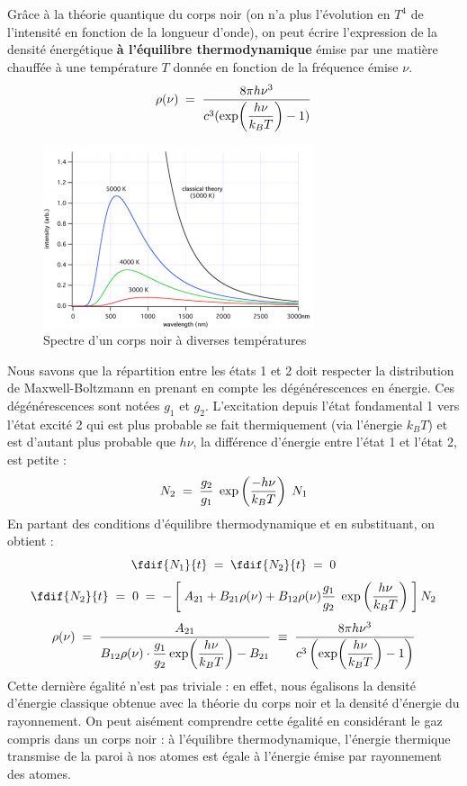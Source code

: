 Grâce à la théorie quantique du corps noir (on n'a plus l'évolution en $T^4$ de l'intensité en fonction de la longueur d'onde), on peut écrire l'expression de la densité énergétique \textbf{à l'équilibre thermodynamique} émise par une matière chauffée à une température $T$ donnée en fonction de la fréquence émise $\nu$.
\begin{equation}
    \rho(\nu) \; = \; \dfrac{8\pi h \nu^3}{c^3(\exp(\dfrac{h\nu}{k_BT})-1)}
\end{equation}
\begin{figure}[htp]
    \centering
    \includegraphics[scale=1.1]{Images2/corps_noir.png}
    \caption{Spectre d'un corps noir à diverses températures}
    \label{fig : Corps noir}
\end{figure}
Nous savons que la répartition entre les états 1 et 2 doit respecter la distribution de Maxwell-Boltzmann en prenant en compte les dégénérescences en énergie. Ces dégénérescences sont notées $g_1$ et $g_2$. L'excitation depuis l'état fondamental 1 vers l'état excité 2 qui est plus probable se fait thermiquement (via l'énergie $k_BT$) et est d'autant plus probable que $h\nu$, la différence d'énergie entre l'état 1 et l'état 2, est petite :
\[
    N_2 \; = \; \dfrac{g_2}{g_1} \; \exp\left(\dfrac{-h\nu}{k_BT}\right) \;N_1
\]
En partant des conditions d'équilibre thermodynamique et en substituant, on obtient :
\[
    \fdif{N_1}{t} \eq \fdif{N_2}{t} \eq 0
\]
\[
    \fdif{N_2}{t}
    \eq 0
    \eq - \left[\;A_{21} + B_{21} \rho(\nu) + B_{12}\rho(\nu) \dfrac{g_1}{g_2} \; \exp\left(\dfrac{h\nu}{k_BT}\right) \;\right] N_2
\]
\[
    \rho(\nu)
    \; = \; \dfrac{A_{21}}{B_{12}\rho(\nu) \cdot \dfrac{g_1}{g_2} \exp(\dfrac{h\nu}{k_BT}) - B_{21}}
    \;\equiv\; \dfrac{8\pi h \nu^3}{c^3\left(\exp(\dfrac{h\nu}{k_BT})-1\right)}
\]
Cette dernière égalité n'est pas triviale : en effet, nous égalisons la densité d'énergie classique obtenue avec la théorie du corps noir et la densité d'énergie du rayonnement. On peut aisément comprendre cette égalité en considérant le gaz compris dans un corps noir : à l'équilibre thermodynamique, l'énergie thermique transmise de la paroi à nos atomes est égale à l'énergie émise par rayonnement des atomes.\\
